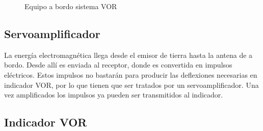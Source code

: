 \begin{figure}[!hb]
  \centering
  \caption{Equipo a bordo sistema VOR}
\end{figure}


\subsection{Servoamplificador}
La energía electromagnética llega desde el emisor de tierra hasta la antena de a bordo. Desde allí es enviada al receptor, donde es convertida en impulsos eléctricos. Estos impulsos no bastarán para producir las deflexiones necesarias en indicador VOR, por lo que tienen que ser tratados por un servoamplificador. Una vez amplificados los impulsos ya pueden ser transmitidos al indicador.

\subsection{Indicador VOR}

